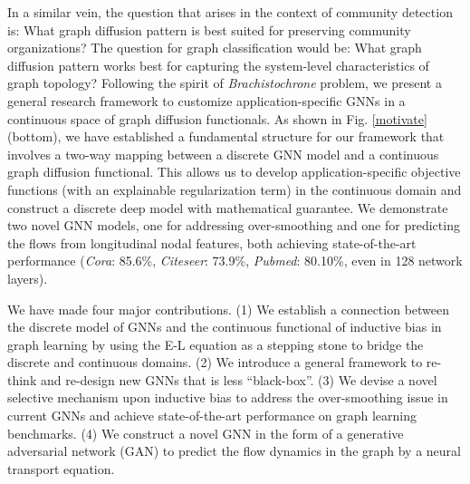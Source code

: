 \documentclass{article}
\begin{document}
In a similar vein, the question that arises in the context of community detection is: What graph diffusion pattern is best suited for preserving community organizations? The question for graph classification would be: What graph diffusion pattern works best for capturing the system-level characteristics of graph topology? Following the spirit of \textit{Brachistochrone} problem, we present a general research framework to customize application-specific GNNs in a continuous space of graph diffusion functionals. As shown in Fig. \ref{motivate} (bottom), we have established a fundamental structure for our framework that involves a two-way mapping between a discrete GNN model and a continuous graph diffusion functional. This allows us to develop application-specific objective functions (with an explainable regularization term) in the continuous domain and construct a discrete deep model with mathematical guarantee. We demonstrate two novel GNN models, one for addressing over-smoothing and one for predicting the flows from longitudinal nodal features, both achieving state-of-the-art performance (\textit{Cora}: 85.6\%, \textit{Citeseer}: 73.9\%, \textit{Pubmed}: 80.10\%, even in 128 network layers).

We have made four major contributions. (1) We establish a connection between the discrete model of GNNs and the continuous functional of inductive bias in graph learning by using the E-L equation as a stepping stone to bridge the discrete and continuous domains. (2) We introduce a general framework to re-think and re-design new GNNs that is less ``black-box''. (3) We devise a novel selective mechanism upon inductive bias to address the over-smoothing issue in current GNNs and achieve state-of-the-art performance on graph learning benchmarks. (4) We construct a novel GNN in the form of a generative adversarial network (GAN) to predict the flow dynamics in the graph by a neural transport equation.


\end{document}
